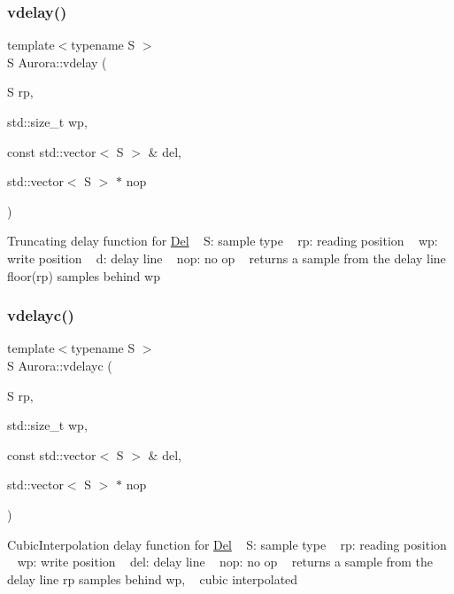 \subsubsection{\texorpdfstring{vdelay()}{vdelay()}}
{\footnotesize\ttfamily template$<$typename S $>$ \\
S Aurora\+::vdelay (\begin{DoxyParamCaption}\item[{S}]{rp,  }\item[{std\+::size\+\_\+t}]{wp,  }\item[{const std\+::vector$<$ S $>$ \&}]{del,  }\item[{std\+::vector$<$ S $>$ $\ast$}]{nop }\end{DoxyParamCaption})\hspace{0.3cm}{\ttfamily [inline]}}

Truncating delay function for \hyperlink{class_aurora_1_1_del}{Del} ~\newline
S\+: sample type ~\newline
rp\+: reading position ~\newline
wp\+: write position ~\newline
d\+: delay line ~\newline
nop\+: no op ~\newline
returns a sample from the delay line floor(rp) samples behind wp \mbox{\label{namespace_aurora_ae0b6df856278006b4fed4641f8ffe051}} 
\subsubsection{\texorpdfstring{vdelayc()}{vdelayc()}}
{\footnotesize\ttfamily template$<$typename S $>$ \\
S Aurora\+::vdelayc (\begin{DoxyParamCaption}\item[{S}]{rp,  }\item[{std\+::size\+\_\+t}]{wp,  }\item[{const std\+::vector$<$ S $>$ \&}]{del,  }\item[{std\+::vector$<$ S $>$ $\ast$}]{nop }\end{DoxyParamCaption})\hspace{0.3cm}{\ttfamily [inline]}}

Cubic\+Interpolation delay function for \hyperlink{class_aurora_1_1_del}{Del} ~\newline
S\+: sample type ~\newline
rp\+: reading position ~\newline
wp\+: write position ~\newline
del\+: delay line ~\newline
nop\+: no op ~\newline
returns a sample from the delay line rp samples behind wp, ~\newline
cubic interpolated \mbox{\label{namespace_aurora_a6882049233d07537b7f0bdff7d703306}} 
